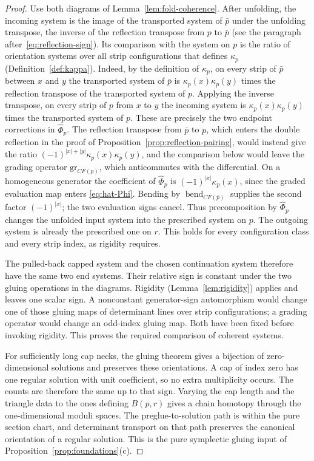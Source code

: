 \documentclass[11pt]{amsart}
\theoremstyle{definition}
\theoremstyle{remark}
\theoremstyle{plain}
\numberwithin{equation}{section}
\newcommand{\CF}{\mathit{CF}}
\newcommand{\eps}{\mathrm{gr}}
\begin{document}
\begin{proof}
Use both diagrams of Lemma~\ref{lem:fold-coherence}. After
unfolding, the incoming system is the image of the transported
system of $\bar p$ under the unfolding transpose, the inverse of the
reflection transpose from $p$ to $\bar p$ (see the paragraph
after~\eqref{eq:reflection-sign}). Its comparison with the system on
$p$ is the ratio of orientation systems over all strip configurations
that defines $\kappa_p$ (Definition~\ref{def:kappa}). Indeed, by the definition of $\kappa_p$, on every strip of
$\bar p$ between $x$ and $y$ the transported system of $\bar p$ is
$\kappa_p(x)\kappa_p(y)$ times the reflection transpose of the transported
system of $p$. Applying the inverse transpose, on every strip of $p$
from $x$ to $y$ the incoming system is $\kappa_p(x)\kappa_p(y)$ times
the transported system of $p$. These are precisely the two endpoint
corrections in $\widehat\Phi_p$. The reflection transpose from $\bar p$
to $p$, which enters the double reflection in the proof of
Proposition~\ref{prop:reflection-pairing}, would instead give the ratio
$(-1)^{|x|+|y|}\kappa_p(x)\kappa_p(y)$, and the comparison below would
leave the grading operator $\eps_{\CF(p)}$, which anticommutes with
the differential. On a homogeneous generator the coefficient of $\widehat\Phi_p$ is $(-1)^{|x|}\kappa_p(x)$, since the graded evaluation
map enters \eqref{eq:hat-Phi}. Bending by $\operatorname{bend}_{\CF(\bar p)}$ supplies
the second factor $(-1)^{|x|}$; the two evaluation signs cancel.
Thus precomposition by
$\widehat\Phi_p$ changes the unfolded input system into the
prescribed system on $p$. The outgoing system is already the
prescribed one on $r$. This holds for every configuration
class and every strip index, as rigidity requires.

The pulled-back capped system and the chosen continuation system
therefore have the same two end systems. Their relative sign is
constant under the two gluing operations in the diagrams. Rigidity
(Lemma~\ref{lem:rigidity}) applies and leaves one scalar sign. A
nonconstant generator-sign automorphism would change one of those
gluing maps of determinant lines over strip configurations; a grading operator would change
an odd-index gluing map. Both have been fixed before invoking
rigidity. This proves the required comparison of coherent systems.

For sufficiently long cap necks,
the gluing theorem gives a bijection
of zero-dimensional solutions and
preserves these orientations. A cap
of index zero has one regular
solution with unit coefficient, so
no extra multiplicity occurs. The
counts are therefore the same
up to that sign. Varying the cap
length and the triangle data to the
ones defining $B(p,r)$ gives a
chain homotopy through the
one-dimensional moduli spaces.
The preglue-to-solution path is
within the pure section chart,
and determinant transport on that
path preserves the canonical
orientation of a regular solution.
This is the pure symplectic gluing
input of Proposition~\ref{prop:foundations}(c).
\end{proof}
\end{document}
